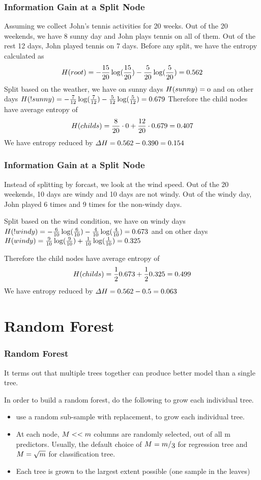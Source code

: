 \documentclass[notheorems, aspectratio=54]{beamer}
\begin{document}
\begin{frame}
\frametitle{Information Gain at a Split Node}
Assuming we collect John's tennis activities for 20 weeks. Out of the 20 weekends, we have 8 sunny day and John plays tennis on all of them. Out of the rest 12 days, John played tennis on 7 days. 
Before any split, we have the entropy calculated as 
    $$
     \mathnormal{H(root)}=-\frac{15}{20}\log(\frac{15}{20})-\frac{5}{20}\log(\frac{5}{20})=0.562
    $$
Split based on the weather, we have on sunny days
$
 \mathnormal{H(sunny)=0}
$
and on other days
$
\mathnormal{H(!sunny)}=-\frac{7}{12}\log(\frac{7}{12})-\frac{5}{12}\log(\frac{5}{12})=0.679
$
Therefore the child nodes have average entropy of 
$$
\mathnormal{H(childs)}=\frac{8}{20}\cdot 0+\frac{12}{20}\cdot 0.679=0.407
$$
We have entropy reduced by $\mathnormal{\Delta H}=0.562-0.390=0.154$
\end{frame}

\begin{frame}
\frametitle{Information Gain at a Split Node}
Instead of splitting by forcast, we look at the wind speed. Out of the 20 weekends, 10 days are windy and 10 days are not windy. Out of the windy day, John played 6 times and 9 times for the non-windy days.

Split based on the wind condition, we have on windy days
$
\mathnormal{H(!windy)}=-\frac{6}{10}\log(\frac{6}{10})-\frac{4}{10}\log(\frac{4}{10})=0.673
$
and on other days
$
\mathnormal{H(windy)}=\frac{9}{10} \log(\frac{9}{10})+\frac{1}{10} \log(\frac{1}{10})=0.325
$

Therefore the child nodes have average entropy of 
$$
\mathnormal{H(childs)}=\frac{1}{2} 0.673+\frac{1}{2} 0.325=0.499
$$
We have entropy reduced by $\mathnormal{\Delta H}=0.562-0.5=0.063$
\end{frame}




\section{Random Forest}
\begin{frame}

\frametitle{Random Forest}
It terms out that multiple trees together can produce better model than a single tree. 

In order to build a random forest, do the following to grow each individual tree.
\begin{itemize}
\item  use a random sub-sample with replacement, to grow each individual tree.
\item  At each node,  $\mathnormal{M<<m}$ columns are randomly selected, out of all m predictors. Usually, the default choice of $\mathnormal{M=m/3}$ for regression tree and $\mathnormal{M=\sqrt{m}}$ for classification tree.
\item Each tree is grown to the largest extent possible (one sample in the leaves)

\end{itemize}
\end{frame}
\end{document}

